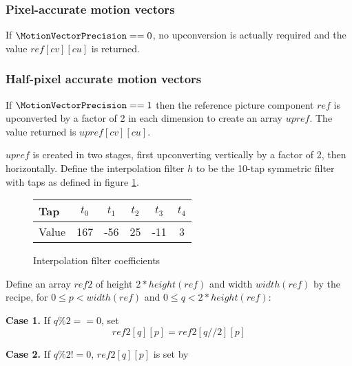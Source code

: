 \subsubsection{Pixel-accurate motion vectors}

If $\MotionVectorPrecision==0$, no upconversion is actually required and the value
$ref[cv][cu]$ is returned.

\subsubsection{Half-pixel accurate motion vectors}
\label{halfpel}

If $\MotionVectorPrecision==1$ then the reference picture component $ref$ is
upconverted by a factor of 2 in each dimension to create an
array $upref$. The value returned is $upref[cv][cu]$.

$upref$ is created in two stages, first upconverting vertically by
a factor of 2, then horizontally. Define the interpolation filter $h$
to be the 10-tap symmetric filter with taps as defined in figure \ref{upfilter}.

\begin{figure}[h!]
\begin{centering}
\begin{tabular}{l|ccccc}
Tap & $t_0$ & $t_1$ & $t_2$ & $t_3$ & $t_4$\\
\hline
Value & 167 & -56 & 25 & -11 & 3
\end{tabular}
\caption{Interpolation filter coefficients \label{upfilter}}
\end{centering}
\end{figure}

Define an array $ref2$ of height $2*height(ref)$ and width $width(ref)$ by
the recipe, for $0\leq p<width(ref)$ and $0\leq q<2*height(ref)$:

{\bf Case 1.} If $q\%2==0$, set
\begin{equation*}
ref2[q][p]=ref2[q//2][p]
\end{equation*}

{\bf Case 2.} If $q\%2!=0$, $ref2[q][p]$ is set by

\begin{pseudo*}
\end{pseudo*}

